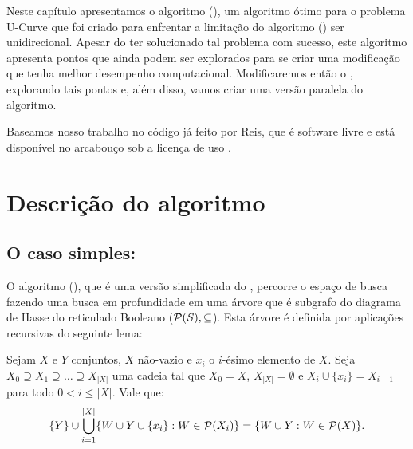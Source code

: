 Neste capítulo apresentamos o algoritmo  
(), um algoritmo ótimo para o problema U-Curve que foi 
criado para enfrentar a limitação do algoritmo  () ser unidirecional. Apesar do 
ter solucionado tal problema com sucesso, este algoritmo apresenta 
pontos que ainda podem ser explorados para se criar uma modificação que
tenha melhor desempenho computacional. Modificaremos então o 
, explorando tais pontos e, além disso, vamos criar uma
versão paralela do algoritmo.

Baseamos nosso trabalho no código já feito por Reis, que é software 
livre e está disponível no arcabouço  \cite{Reis+17} 
sob a licença de uso .

\section{Descrição do algoritmo}

\subsection{O caso simples: }
O algoritmo  (), que é 
uma versão simplificada do , percorre o espaço de busca 
fazendo uma busca em profundidade em uma árvore que é subgrafo do 
diagrama de Hasse do reticulado Booleano ($\mathcal{P} (S), \subseteq$). 
Esta árvore é definida por aplicações recursivas do seguinte lema:

\begin{mylemma}
\label{lemma:lower_forest}
Sejam $X$ e $Y$ conjuntos, $X$ não-vazio e $x_i$ o $i$-ésimo 
elemento de $X$. Seja $X_0 \supseteq X_1 \supseteq \dots \supseteq 
X_{|X|}$ uma cadeia tal que $X_0 = X$, $X_{|X|} = \emptyset$ e $X_{i} 
\cup \{x_i\} = X_{i - 1}$ para todo $0 < i \leq |X|$. Vale que:
\begin{align*}
\{ Y \} \cup \bigcup_{i = 1}^{|X|} \{W \cup Y \cup \{x_i\} : W \in \mathcal{P} (X_i)\} = \{W \cup Y : W \in \mathcal{P} (X)\}.
\end{align*}
\end{mylemma} 

